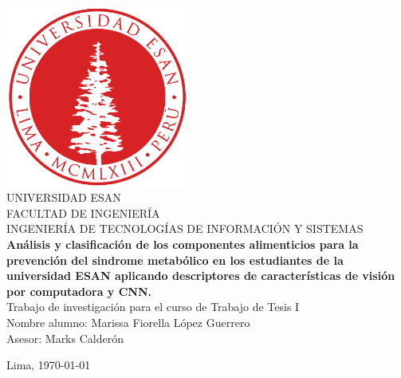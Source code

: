 \documentclass[12pt,times]{report}
\numberwithin{equation}{chapter} %
\begin{document}
\begin{titlepage}

	\begin{center}
	    \includegraphics[width=0.45\textwidth]{images_repo/esanlogomin}
		\vspace*{2cm} \\
		UNIVERSIDAD ESAN \vspace*{1ex} \\
		FACULTAD DE INGENIERÍA \vspace*{1ex} \\
		INGENIERÍA DE TECNOLOGÍAS DE INFORMACIÓN Y SISTEMAS\vspace*{8ex} \\
		\textbf{Análisis y clasificación de los componentes alimenticios para la prevención del sindrome metabólico en los estudiantes de la universidad ESAN aplicando  descriptores de características de visión por computadora y CNN.}
		\vspace*{8ex}\\	
		Trabajo de investigación para el curso de Trabajo de Tesis I 
		\vspace*{8ex} \\	
		Nombre alumno: Marissa Fiorella López Guerrero \\
		Asesor: Marks Calderón		
		\vfill
		
		Lima, \today 
		
	\end{center}
\end{titlepage}
\renewcommand{\tablename}{Tabla}
\renewcommand{\listtablename}{Índice de Tablas}

%
%
%
%

\tableofcontents            %
\end{document}
